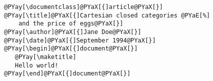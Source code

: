 \begin{Verbatim}[commandchars=@\[\]]
@PYay[\documentclass]@PYaX[{]article@PYaX[}]
@PYay[\title]@PYaX[{]Cartesian closed categories @PYaE[%]
    and the price of eggs@PYaX[}]
@PYay[\author]@PYaX[{]Jane Doe@PYaX[}]
@PYay[\date]@PYaX[{]September 1994@PYaX[}]
@PYay[\begin]@PYaX[{]document@PYaX[}]
   @PYay[\maketitle]
   Hello world!
@PYay[\end]@PYaX[{]document@PYaX[}]
\end{Verbatim}
